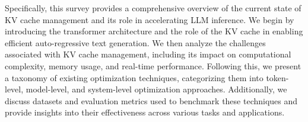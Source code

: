 
Specifically,
this survey provides a comprehensive overview of the current state of KV cache management and its role in accelerating LLM inference. We begin by introducing the transformer architecture and the role of the KV cache in enabling efficient auto-regressive text generation. We then analyze the challenges associated with KV cache management, including its impact on computational complexity, memory usage, and real-time performance. Following this, we present a taxonomy of existing optimization techniques, categorizing them into token-level, model-level, and system-level optimization approaches. 
Additionally, we discuss datasets and evaluation metrics used to benchmark these techniques and provide insights into their effectiveness across various tasks and applications.
 
